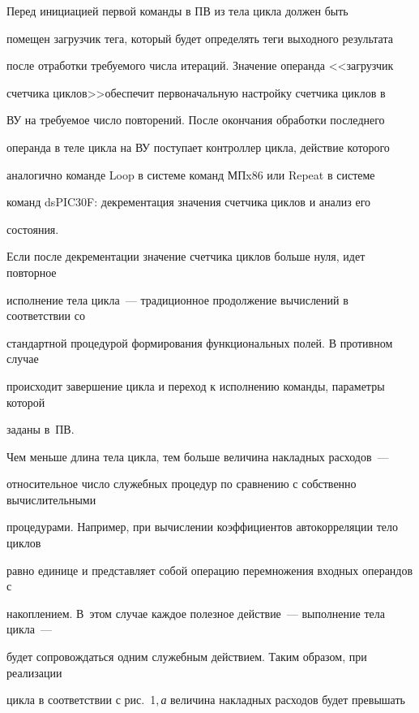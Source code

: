       


      Перед инициацией первой команды в ПВ из тела цикла должен быть 


помещен загрузчик тега, который будет определять теги выходного результата 


после отработки требуемого числа итераций. Значение операнда <<загрузчик 


счетчика циклов>>\linebreak обеспечит первоначальную настройку счетчика циклов в 


ВУ на требуемое число повторений. После окончания обработки последнего 


операнда в теле цикла на ВУ поступает контроллер цикла, действие которого 


аналогично команде Loop в системе команд МПx86 или Repeat в системе 


команд dsPIC30F: декрементация значения счетчика циклов и анализ его 


состояния. 


      


Если после декрементации значение счетчика циклов больше нуля, идет повторное 


исполнение тела цикла~--- традиционное продолжение вычислений в соответствии со 


стандартной процедурой формирования функциональных полей. В противном случае 


происходит завершение цикла и переход к исполнению команды, параметры которой 


заданы в~ПВ.





Чем меньше длина тела цикла, тем больше величина накладных расходов~--- 


относительное число служебных процедур по сравнению с собственно вычислительными 


процедурами. Например, при вычислении коэффициентов автокорреляции тело циклов 


равно единице и представляет собой операцию перемножения входных операндов с 


накоплением. В~этом случае каждое полезное действие~--- выполнение тела цикла~--- 


будет сопровождаться одним служебным действием. Таким образом, при реализации 


цикла в соответствии с рис.~1,\,\textit{а} величина накладных расходов будет превышать 


